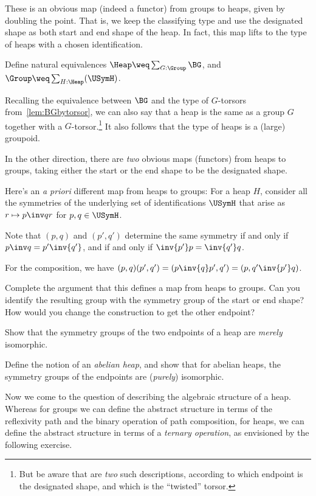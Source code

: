 These is an obvious map (indeed a functor) from groups to heaps,
given by doubling the point.
That is, we keep the classifying type and use the designated shape
as both start and end shape of the heap.
In fact, this map lifts to the type of heaps with a chosen identification.
\begin{exercise}\label{xca:group+torsor-heap}
  Define natural equivalences $\Heap \weq \sum_{G:\Group}\BG$,
  and $\Group \weq \sum_{H:\Heap}(\USymH)$.
\end{exercise}
Recalling the equivalence between $\BG$ and the type of $G$-torsors
from~\cref{lem:BGbytorsor},
we can also say that a heap is the same
as a group $G$ together with a $G$-torsor.\footnote{%
  But be aware that are \emph{two} such descriptions,
  according to which endpoint is the designated shape,
  and which is the ``twisted'' torsor.}
It also follows that the type of heaps is a (large) groupoid.

In the other direction,
there are \emph{two} obvious maps (functors) from heaps to groups,
taking either the start or the end shape to be the designated shape.

Here's an \emph{a priori} different map from heaps to groups:
For a heap $H$, consider all the
symmetries of the underlying set of identifications $\USymH$
that arise as $r \mapsto p\inv q r$ for $p,q\in \USymH$.

Note that $(p,q)$ and $(p',q')$ determine the same symmetry
if and only if $p\inv q = p'\inv{q'}$, and if and only if
$\inv{p'}p = \inv{q'}q$.

For the composition, we have $(p,q)(p',q') = (p\inv{q}p',q') = (p,q'\inv{p'}q)$.

\begin{exercise}
  Complete the argument that this defines a map
  from heaps to groups. Can you identify the resulting group
  with the symmetry group of the start or end shape?
  How would you change the construction to get the other endpoint?
\end{exercise}

\begin{exercise}
  Show that the symmetry groups of the two endpoints of a heap
  are \emph{merely} isomorphic.

  Define the notion of an \emph{abelian heap},
  and show that for abelian heaps,
  the symmetry groups of the endpoints are (\emph{purely}) isomorphic.
\end{exercise}

Now we come to the question of describing the algebraic structure
of a heap.
Whereas for groups we can define the abstract structure
in terms of the reflexivity path and the binary operation of path composition,
for heaps, we can define the abstract structure
in terms of a \emph{ternary operation},
as envisioned by the following exercise.

